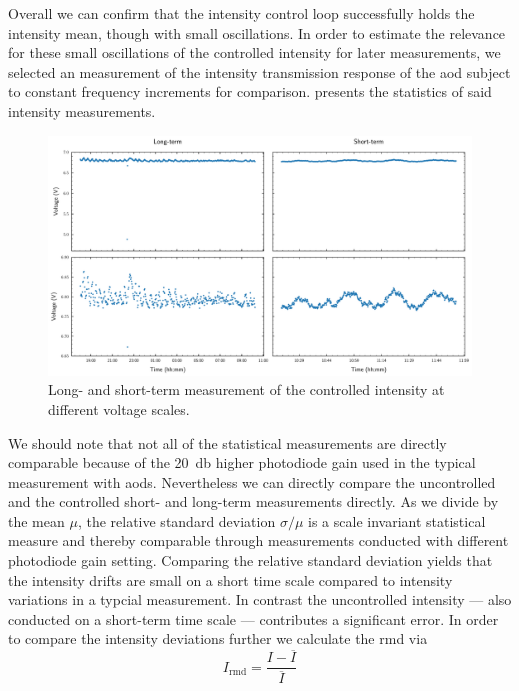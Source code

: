 Overall we can confirm that the intensity control loop successfully holds the
intensity mean, though with small oscillations. In order to estimate the
relevance for these small oscillations of the controlled intensity for later
measurements, we selected an measurement of the intensity transmission
response of the \gls{aod} subject to constant frequency increments for
comparison.  presents the statistics of
said intensity measurements.
\begin{figure}[htb]
  \centering
\includegraphics[width=\textwidth]{../figure/intensity/control/long-short.pdf}
  \caption{Long- and short-term measurement of the controlled intensity at
    different voltage scales.
  }\label{fig:intensity_control}
\end{figure}
We should note that not all of the statistical measurements are directly
comparable because of the \SI{20}{\decibel} higher photodiode gain used in
the typical measurement with \gls{aod}s. Nevertheless we can directly compare
the uncontrolled and the controlled short- and long-term measurements
directly. As we divide by the mean $\mu$, the relative standard deviation
$\sigma/\mu$ is a scale invariant statistical measure and thereby comparable
through measurements conducted with different photodiode gain setting.
Comparing the relative standard deviation yields that the intensity drifts
are small on a short time scale compared to intensity variations in a typcial
measurement. In contrast the uncontrolled intensity --- also conducted on
a short-term time scale --- contributes a significant error. In order to
compare the intensity deviations further we calculate the \gls{rmd} via
\begin{equation}
  I_\text{rmd}
  =
  \frac{I-\overline{I}}{\overline{I}}
  \label{eq:relative_mean_deviation}
\end{equation}
